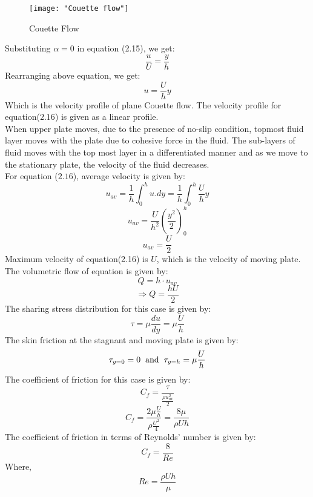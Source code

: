 \documentclass[14pt,one side, a4paper]{extbook}
\begin{document}
	 	\begin{figure}[ht]
	 		\centering
	 		\texttt{[image: "Couette flow"]}
	 		\caption{Couette Flow}
	 		\label{fig:couette-flow}
	 	\end{figure}
	 	
	 	
	 	Substituting $\alpha=0$ in equation (2.15), we get:
	 	\begin{equation}
	 		\frac{u}{U}=\frac{y}{h}
	 	\end{equation}
	 	Rearranging above equation, we get:
	 	\begin{equation}
	 		u=\frac{U}{h}y
	 	\end{equation}
	 	Which is the velocity profile of plane Couette flow. The velocity profile for equation($2.16$) is given as a linear profile.
	 	\\When upper plate moves, due to the presence of no-slip condition, topmost fluid layer moves with the plate due to cohesive force in the fluid. The sub-layers of fluid moves with the top most layer in a differentiated manner and as we move to the stationary plate, the velocity of the fluid decreases. 
	 	\\For equation ($2.16$), average velocity is given by:
	 	\begin{equation}
	 		u_{av}=\frac{1}{h}\int_{0}^{h}u.dy=\frac{1}{h}\int_{0}^{h}\frac{U}{h}y
	 	\end{equation} 
	 	$$	u_{av}=\frac{U}{h^2}\left(\frac{y^{2}}{2}\right)_{0}^{h}$$
	 	$$	u_{av}=\frac{U}{2}$$
	 	Maximum velocity of equation(2.16) is $U$, which is the velocity of moving plate. 
	 	The volumetric flow of equation is given by:
	 	\begin{equation}
	 		Q=h\cdot{u_{av}}
	 	\end{equation}
	 	$$\Longrightarrow Q=\frac{hU}{2}$$ 
	 	The sharing stress distribution for this case is given by:
	 	\begin{equation}
	 		\tau=\mu \frac{du}{dy}=\mu\frac{U}{h}
	 	\end{equation} 
	 	The skin friction at the stagnant and moving plate is given by:
	 	\begin{equation}
	 		\tau_{y=0}=0\hspace{0.2cm} \textrm{and} \hspace{0.2cm}\tau_{y=h}=\mu\frac{U}{h}
	 	\end{equation}
	 	The coefficient of friction for this case is given by:
	 	\begin{equation}	C_{f}=\displaystyle{\frac{\tau}{\frac{\rho u_{av}^{2}}{2}}}
	 	\end{equation}
	 	$${C_{f}=\frac{2\mu\frac{U}{h}}{\rho\frac{U^{2}}{4}}=\frac{8\mu}{\rho Uh}}$$ 
	 	The coefficient of friction in terms of Reynolds' number is given by:
	 	$$C_{f}=\frac{8}{Re}$$
	 	Where, $$Re=\frac{\rho Uh}{\mu}$$
\end{document}
